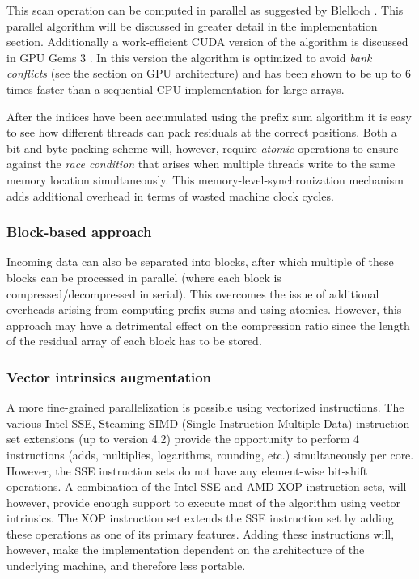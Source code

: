  This scan operation can be computed in parallel as suggested by Blelloch \cite{blelloch1990prefix}. This parallel algorithm will be discussed in greater detail in the 
 implementation section. Additionally a work-efficient CUDA version of the algorithm is discussed in GPU Gems 3 \cite{harris2007parallel}. In this version the algorithm is 
 optimized to avoid \textit{bank conflicts} (see the section on GPU architecture) and has been shown to be up to 6 times faster than a sequential CPU implementation for large 
 arrays.
 
 After the indices have been accumulated using the prefix sum algorithm it is easy to see how different threads can pack residuals at the correct positions. Both a bit and byte
 packing scheme will, however, require \textit{atomic} operations to ensure against the \textit{race condition} that arises when multiple threads write to the same memory 
 location simultaneously. This memory-level-synchronization mechanism adds additional overhead in terms of wasted machine clock cycles.
 \subsubsection{Block-based approach}
 Incoming data can also be separated into blocks, after which multiple of these blocks can be processed in parallel (where each block is compressed/decompressed in serial). This overcomes the issue of 
 additional overheads arising from computing prefix sums and using atomics. However, this approach may have a detrimental effect on the compression ratio since the length of the residual array of each block 
 has to be stored.
 \subsubsection{Vector intrinsics augmentation}
 A more fine-grained parallelization is possible using vectorized instructions. The various Intel SSE, Steaming SIMD (Single Instruction Multiple Data) instruction set extensions (up to version 4.2) provide
 the opportunity to perform 4 instructions (adds, multiplies, logarithms, rounding, etc.) simultaneously per core. However, the SSE instruction sets do not have any element-wise bit-shift operations. A combination 
 of the Intel SSE and AMD XOP instruction sets, will however, provide enough support to execute most of the algorithm using vector intrinsics. The XOP instruction set extends the SSE instruction set by adding these 
 operations as one of its primary features. Adding these instructions will, however, make the implementation dependent on the architecture of the underlying machine, and therefore less portable. 
 
